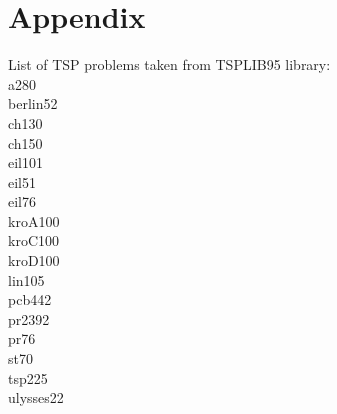 
\newpage
\chapter{Appendix}
List of TSP problems taken from TSPLIB95 library:\\
a280\\
berlin52\\
ch130\\
ch150\\
eil101\\
eil51\\
eil76\\
kroA100\\
kroC100\\
kroD100\\
lin105\\
pcb442\\
pr2392\\
pr76\\
st70\\
tsp225\\
ulysses22\\ 



\newpage
{}
{}
\listoffigures




\newpage
{}
{}
\listoftables




%


%